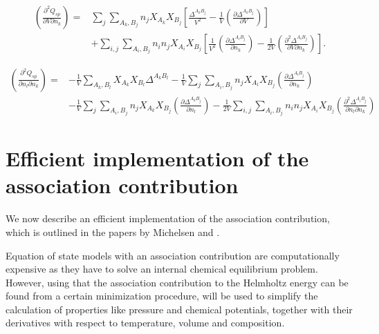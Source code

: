 \documentclass[10pt, a4paper]{article}
\newcommand*{\pder}[2]{\left(\frac{\partial #1}{\partial #2}\right)}
\newcommand*{\pdcross}[3]{\left(\frac{\partial^2 #1}{\partial #2 \partial #3}\right)}
\begin{document}
\begin{align*}
  \pdcross{Q_{sp}}{V}{n_k} =& \sum_{j} \sum_{A_k,B_j} n_j X_{A_k} X_{B_j} \left[ \frac{\Delta^{A_k B_j}}{V^2} - \frac{1}{V} \pder{\Delta^{A_k B_j}}{V}\right] \\
  &+ \sum_{i,j} \sum_{A_i, B_j} n_i n_j X_{A_i} X_{B_j} \left[ \frac{1}{V^2} \pder{\Delta^{A_i B_j}}{n_k} - \frac{1}{2V} \pdcross{\Delta^{A_i B_j}}{V}{n_k} \right].
\end{align*}


\begin{align*}
  \pdcross{Q_{sp}}{n_l}{n_k} =& - \frac{1}{V} \sum_{A_k, B_l} X_{A_k} X_{B_l} \Delta^{A_k B_l} - \frac{1}{V} \sum_{j} \sum_{A_i, B_j} n_j X_{A_l} X_{B_j} \pder{\Delta^{A_l B_j}}{n_k} \\
  &- \frac{1}{V} \sum_{j} \sum_{A_i, B_j} n_j X_{A_k} X_{B_j} \pder{\Delta^{A_k B_j}}{n_l} - \frac{1}{2V} \sum_{i,j} \sum_{A_i, B_j} n_i n_j X_{A_i} X_{B_j} \pdcross{\Delta^{A_i B_j}}{n_l}{n_k}
\end{align*}


\section{Efficient implementation of the association contribution} \label{effImp}
We now describe an efficient implementation of the association contribution, which is outlined in the papers by Michelsen \cite{Michelsen01} and \cite{Michelsen06}.

Equation of state models with an association contribution are computationally expensive as they have to solve an internal chemical equilibrium problem. However, using that the association contribution to the Helmholtz energy can be found from a certain minimization procedure, will be used to simplify the calculation of properties like pressure and chemical potentials, together with their derivatives with respect to temperature, volume and composition.
\end{document}
